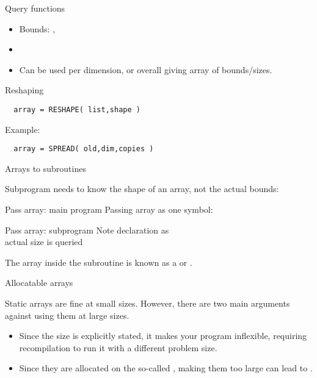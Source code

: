 \begin{slide}{Query functions}
  \label{sl:farray-query}
  \begin{itemize}
  \item Bounds: , 
  \item {}
  \item Can be used per dimension, or overall giving array of bounds/sizes.
  \end{itemize}
\end{slide}

 {Reshaping}

\begin{lstlisting}
  array = RESHAPE( list,shape )
\end{lstlisting}
Example:

\begin{lstlisting}
  array = SPREAD( old,dim,copies )
\end{lstlisting}

 {Arrays to subroutines}

Subprogram needs to know the shape of an array, not the actual bounds:

\begin{block}{Pass array: main program}
  \label{sl:farray-pass1d-main}
  Passing array as one symbol:
\end{block}

\begin{block}{Pass array: subprogram}
  \label{sl:farray-pass1d-subr}
  Note declaration as \\
  actual size is queried
\end{block}

The array inside the subroutine is known as a
 or
.

 {Allocatable arrays}
\label{sec:allocatable}

Static arrays are fine at small sizes. However, 
there are two main arguments against using them at large sizes.
\begin{itemize}
\item Since the size is explicitly stated, it makes your program
  inflexible, requiring recompilation to run it with a different
  problem size.
\item Since they are allocated on the so-called ,
  making them too large can lead to .
\end{itemize}

